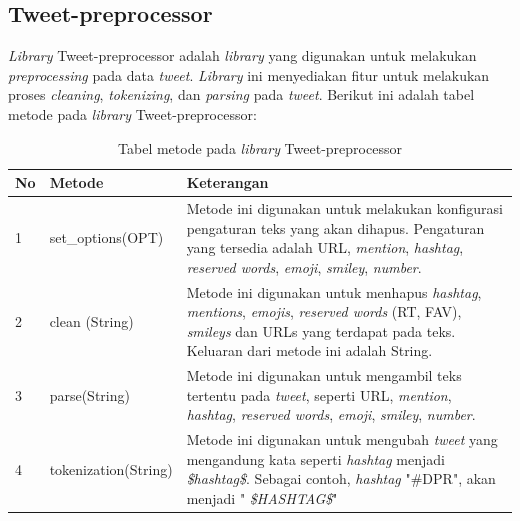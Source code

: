 \subsection{Tweet-preprocessor}
\textit{Library} Tweet-preprocessor adalah \textit{library} 
yang digunakan untuk melakukan \textit{preprocessing} pada data 
\textit{tweet}. \textit{Library }ini menyediakan fitur untuk 
melakukan proses \textit{cleaning}, \textit{tokenizing}, dan 
\textit{parsing }pada \textit{tweet}. Berikut ini adalah tabel 
metode pada \textit{library }Tweet-preprocessor:
\begin{table}[H]
	\caption{Tabel metode pada \textit{library} Tweet-preprocessor}
	\centering
	\small
	\begin{adjustbox}{width=1\textwidth}
	\begin{tabular}{|p{0.5cm}|p{6cm}|p{6cm}|}
		\hline
		\textbf{No} & \textbf{Metode} & \textbf{Keterangan} \\
		\hline
		1 & set\_options(OPT) & Metode ini digunakan untuk melakukan konfigurasi 
		pengaturan teks yang akan dihapus. Pengaturan yang tersedia adalah URL, 
		\textit{mention}, \textit{hashtag}, \textit{reserved words}, 
		\textit{emoji}, \textit{smiley}, \textit{number}. \\
		\hline
		2 & clean (String) & Metode ini digunakan untuk menhapus \textit{
			hashtag},\textit{ mentions}, \textit{emojis}, \textit{reserved 
			words} (RT, FAV), \textit{smileys} dan URLs yang terdapat pada teks. 
		Keluaran dari metode ini adalah String. \\
		\hline
		3 & parse(String) & Metode ini digunakan untuk mengambil teks tertentu 
		pada \textit{tweet}, seperti URL, \textit{mention}, \textit{
			hashtag}, \textit{reserved words}, \textit{emoji}, \textit{
			smiley}, \textit{number}. \\
		\hline
		4 & tokenization(String) & Metode ini digunakan untuk mengubah \textit{
			tweet} yang mengandung kata seperti \textit{hashtag} menjadi \textit{
			\$hashtag\$}. Sebagai contoh, \textit{
			hashtag }"\#DPR", akan menjadi "\textit{
			\$HASHTAG\$}" \\
		\hline
	\end{tabular}
	\end{adjustbox}
\end{table}

